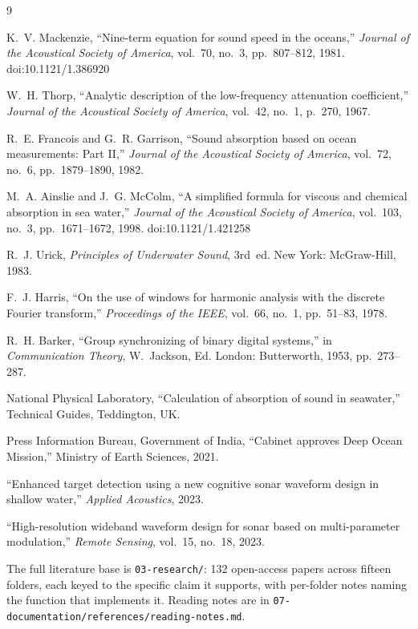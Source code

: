 \documentclass[11pt,a4paper]{article}
\begin{document}
\begin{thebibliography}{9}
\small

K.~V. Mackenzie, ``Nine-term equation for sound speed in the oceans,''
\textit{Journal of the Acoustical Society of America}, vol.~70, no.~3,
pp.~807--812, 1981. doi:10.1121/1.386920

W.~H. Thorp, ``Analytic description of the low-frequency attenuation
coefficient,'' \textit{Journal of the Acoustical Society of America}, vol.~42,
no.~1, p.~270, 1967.

R.~E. Francois and G.~R. Garrison, ``Sound absorption based on ocean
measurements: Part II,'' \textit{Journal of the Acoustical Society of America},
vol.~72, no.~6, pp.~1879--1890, 1982.

M.~A. Ainslie and J.~G. McColm, ``A simplified formula for viscous and chemical
absorption in sea water,'' \textit{Journal of the Acoustical Society of
America}, vol.~103, no.~3, pp.~1671--1672, 1998. doi:10.1121/1.421258

R.~J. Urick, \textit{Principles of Underwater Sound}, 3rd~ed. New York:
McGraw-Hill, 1983.

F.~J. Harris, ``On the use of windows for harmonic analysis with the discrete
Fourier transform,'' \textit{Proceedings of the IEEE}, vol.~66, no.~1,
pp.~51--83, 1978.

R.~H. Barker, ``Group synchronizing of binary digital systems,'' in
\textit{Communication Theory}, W.~Jackson, Ed. London: Butterworth, 1953,
pp.~273--287.

National Physical Laboratory, ``Calculation of absorption of sound in
seawater,'' Technical Guides, Teddington, UK.

Press Information Bureau, Government of India, ``Cabinet approves Deep Ocean
Mission,'' Ministry of Earth Sciences, 2021.

``Enhanced target detection using a new cognitive sonar waveform design in
shallow water,'' \textit{Applied Acoustics}, 2023.

``High-resolution wideband waveform design for sonar based on multi-parameter
modulation,'' \textit{Remote Sensing}, vol.~15, no.~18, 2023.

\end{thebibliography}

\vspace{4mm}
\noindent\small The full literature base is \texttt{03-research/}: 132
open-access papers across fifteen folders, each keyed to the specific claim it
supports, with per-folder notes naming the function that implements it.
Reading notes are in \texttt{07-documentation/references/reading-notes.md}.
\end{document}
